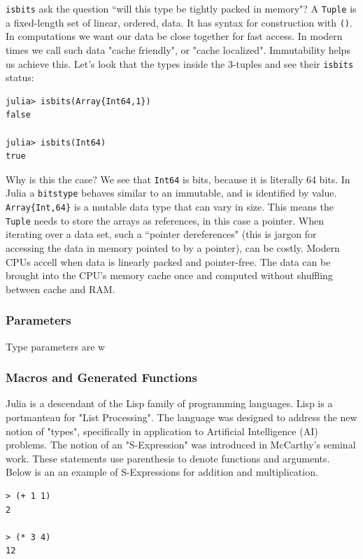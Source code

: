 \documentclass[a4paper]{article}
\begin{document}
\texttt{isbits} ask the question ``will this type be tightly packed in memory"? A
\texttt{Tuple} is a fixed-length set of linear, ordered, data. It has syntax for
construction with \texttt{()}. In computations we want our data be close together
for fast access. In modern times we call such data "cache friendly", or
"cache localized". Immutability helps us achieve this. Let's look that the
types inside the 3-tuples and see their \texttt{isbits} status:
\begin{lstlisting}
julia> isbits(Array{Int64,1})
false

julia> isbits(Int64)
true
\end{lstlisting}
Why is this the case? We see that \texttt{Int64} is bits, because it is literally
64 bits. In Julia a \texttt{bitstype} behaves similar to an immutable, and is identified
by value. \texttt{Array\{Int,64\}} is a mutable data type that can vary in size.
This means
the \texttt{Tuple} needs to store the arrays as references, in this case a
pointer. When iterating over a data set, such a ``pointer dereferences" (this is
jargon for accessing the data in memory pointed to by a pointer), can be costly.
Modern CPUs accell when data is linearly packed and pointer-free. The
data can be brought into the CPU's memory cache once and computed without
shuffling between cache and RAM.

\subsubsection{Parameters}

Type parameters are w

\subsubsection{Macros and Generated Functions}
Julia is a descendant of the Lisp family of programming languages. Lisp
is a portmanteau for "List Processing". The language was designed to address
the new notion of "types", specifically in application to Artificial
Intelligence (AI) problems.\cite{McCarthy_1966} The notion of an "S-Expression"
was introduced in McCarthy's seminal work. These statements use parenthesis
to denote functions and arguments. Below is an an example of S-Expressions
for addition and multiplication.

\begin{lstlisting}
> (+ 1 1)
2

> (* 3 4)
12
\end{lstlisting}
\end{document}
